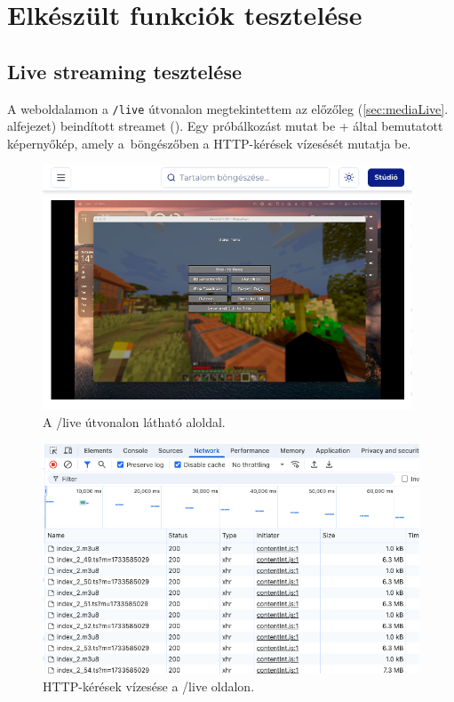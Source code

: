 \chapter{Elkészült funkciók tesztelése}

\section{Live streaming tesztelése}

A weboldalamon a \verb|/live| útvonalon megtekintettem az előzőleg (\ref{sec:mediaLive}. alfejezet) beindított streamet (). Egy próbálkozást mutat be \az+ által bemutatott képernyőkép, amely a~böngészőben a HTTP-kérések vízesését\cite{waterfall} mutatja be.

\begin{figure}[h]
  \centering
  \includegraphics[width=110mm, keepaspectratio]{figures/waterfall1.png}
  \caption{A /live útvonalon látható aloldal.}
  \label{fig:waterfall1}
\end{figure}

\begin{figure}[h]
  \centering
  \includegraphics[width=150mm, keepaspectratio]{figures/waterfall2.png}
  \caption{HTTP-kérések vízesése a /live oldalon.}
  \label{fig:waterfall2}
\end{figure}


